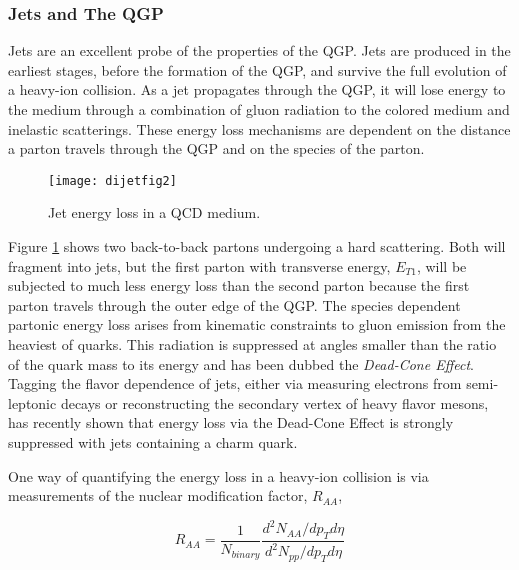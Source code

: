 
\subsubsection{Jets and The QGP}

Jets are an excellent probe of the properties of the QGP.  Jets are produced in the earliest stages, before the formation of the QGP, and survive the full evolution of a heavy-ion collision.  As a jet propagates through the QGP, it will lose energy to the medium through a combination of gluon radiation to the colored medium and inelastic scatterings.  These energy loss mechanisms are dependent on the distance a parton travels through the QGP and on the species of the parton.  


\begin{figure}[b!]
\texttt{[image: dijetfig2]}
\centering
\caption{Jet energy loss in a QCD medium\cite{Mohanty:2013yca}.}
\label{fig:JetEloss}
\end{figure}

Figure \ref{fig:JetEloss} shows two back-to-back partons undergoing a hard scattering.  Both will fragment into jets, but the first parton with transverse energy, $E_{T1}$, will be subjected to much less energy loss than the second parton because the first parton travels through the outer edge of the QGP.  The species dependent partonic energy loss arises from kinematic constraints to gluon emission from the heaviest of quarks.  This radiation is suppressed at angles smaller than the ratio of the quark mass to its energy and has been dubbed the \textit{Dead-Cone Effect}\cite{Thomas:2004ie}.  Tagging the flavor dependence of jets, either via measuring electrons from semi-leptonic decays or reconstructing the secondary vertex of heavy flavor mesons, has recently shown that energy loss via the Dead-Cone Effect is strongly suppressed with jets containing a charm quark\cite{CAO2018255}.

One way of quantifying the energy loss in a heavy-ion collision is via measurements of the nuclear modification factor, $R_{AA}$,


\begin{equation}
R_{AA} = \frac{1}{N_{binary}} \frac{d^{2}N_{AA}/dp_{T}d\eta}{d^{2}N_{pp}/dp_{T}d\eta}
\label{eq:RAA}
\end{equation}

